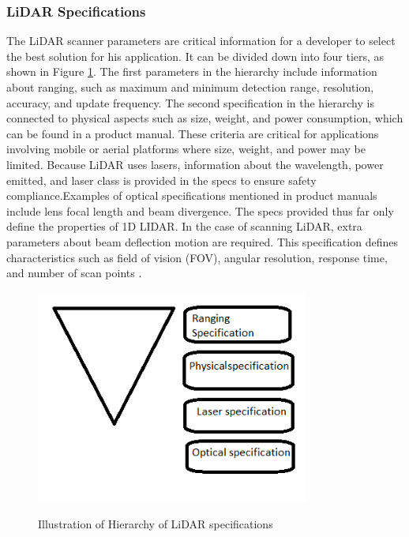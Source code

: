 \subsubsection{LiDAR Specifications}
The LiDAR scanner parameters are critical information for a developer to select the best solution for his application. It can be divided down into four tiers, as shown in Figure \ref{fig:Hierarchy of LiDAR specifications}. 
The first parameters in the hierarchy include information about ranging, such as maximum and minimum detection range, resolution, accuracy, and update frequency. The second specification in the hierarchy is connected to physical aspects such as size, weight, and power consumption, which can be found in a product manual. These criteria are critical for applications involving mobile or aerial platforms where size, weight, and power may be limited. Because LiDAR uses lasers, information about the wavelength, power emitted, and laser class is provided in the specs to ensure safety compliance.Examples of optical specifications mentioned in product manuals include lens focal length and beam divergence. The specs provided thus far only define the properties of 1D LIDAR. In the case of scanning LiDAR, extra parameters about beam deflection motion are required. This specification defines characteristics such as field of vision (FOV), angular resolution, response time, and number of scan points \cite{raj2020survey}.
\begin{figure}[H]
  \centering
  \includegraphics[width=0.8\textwidth]{Figures/Hierarchy of LiDAR specifications.png}
  \caption[Illustration of Hierarchy of LiDAR specifications]{Illustration of Hierarchy of LiDAR specifications} \cite{raj2020survey}
  \label{fig:Hierarchy of LiDAR specifications}
\end{figure}
